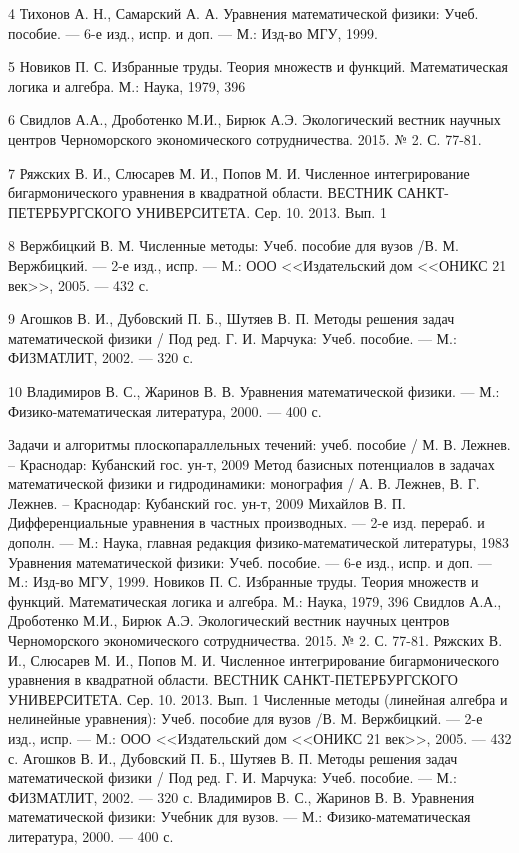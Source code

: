 \documentclass[a4paper]{article}
\begin{document}
4 Тихонов А. Н., Самарский А. А. Уравнения математической физики: Учеб. пособие. --- 6-е изд., испр. и доп. --- М.: Изд-во МГУ, 1999.

5 Новиков П. С. Избранные труды. Теория множеств и функций. Математическая логика и алгебра. М.: Наука, 1979, 396

6 Свидлов А.А., Дроботенко М.И., Бирюк А.Э.
Экологический вестник научных центров Черноморского экономического сотрудничества. 2015. № 2. С. 77-81.

7 Ряжских В. И., Слюсарев М. И., Попов М. И. Численное интегрирование бигармонического уравнения в квадратной области. ВЕСТНИК САНКТ-ПЕТЕРБУРГСКОГО УНИВЕРСИТЕТА. Сер. 10. 2013. Вып. 1

8 Вержбицкий В. М. Численные методы: Учеб. пособие для вузов /В. М. Вержбицкий. --- 2-е изд., испр. --- М.: ООО <<Издательский дом <<ОНИКС 21 век>>, 2005. --- 432 с.

9 Агошков В. И., Дубовский П. Б., Шутяев В. П. Методы решения задач математической физики / Под ред. Г. И. Марчука: Учеб. пособие. --- М.: ФИЗМАТЛИТ, 2002. --- 320 с.

10 Владимиров В. С., Жаринов В. В. Уравнения математической физики. --- М.: Физико-математическая литература, 2000. --- 400 с.

\newpage
\begin{thebibliography}{15}
  Задачи и алгоритмы плоскопараллельных течений: учеб. пособие / М. В. Лежнев. -- Краснодар: Кубанский гос. ун-т, 2009
  Метод базисных потенциалов в задачах математической физики и гидродинамики: монография / А. В. Лежнев, В. Г. Лежнев. -- Краснодар: Кубанский гос. ун-т, 2009
  Михайлов В. П. Дифференциальные уравнения в частных производных. --- 2-е изд. перераб. и дополн. --- М.: Наука, главная редакция физико-математической литературы, 1983
  Уравнения математической физики: Учеб. пособие. --- 6-е изд., испр. и доп. --- М.: Изд-во МГУ, 1999.
  Новиков П. С. Избранные труды. Теория множеств и функций. Математическая логика и алгебра. М.: Наука, 1979, 396
  Свидлов А.А., Дроботенко М.И., Бирюк А.Э.
  Экологический вестник научных центров Черноморского экономического сотрудничества. 2015. № 2. С. 77-81.
  Ряжских В. И., Слюсарев М. И., Попов М. И. Численное интегрирование бигармонического уравнения в квадратной области. ВЕСТНИК САНКТ-ПЕТЕРБУРГСКОГО УНИВЕРСИТЕТА. Сер. 10. 2013. Вып. 1
  Численные методы (линейная алгебра и нелинейные уравнения): Учеб. пособие для вузов /В. М. Вержбицкий. --- 2-е изд., испр. --- М.: ООО <<Издательский дом <<ОНИКС 21 век>>, 2005. --- 432 с.
  Агошков В. И., Дубовский П. Б., Шутяев В. П. Методы решения задач математической физики / Под ред. Г. И. Марчука: Учеб. пособие. --- М.: ФИЗМАТЛИТ, 2002. --- 320 с.
  Владимиров В. С., Жаринов В. В. Уравнения математической физики: Учебник для вузов. --- М.: Физико-математическая литература, 2000. --- 400 с.


\end{thebibliography}
\end{document}
